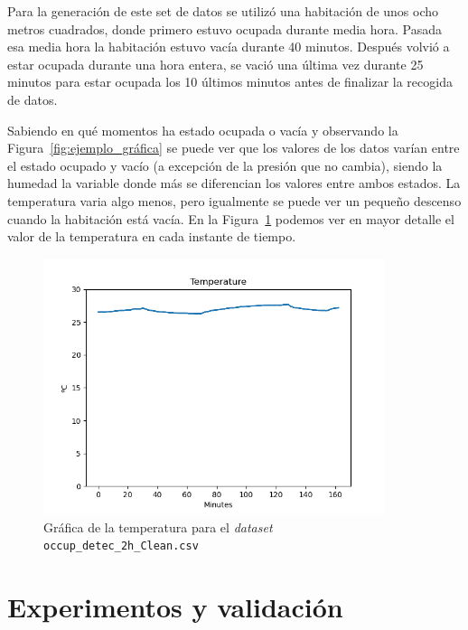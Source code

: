 \documentclass[a4paper, 12pt]{book}
\begin{document}
Para la generación de este set de datos se utilizó una habitación de unos ocho metros cuadrados, donde primero estuvo ocupada durante media hora. Pasada esa media hora la habitación estuvo vacía durante 40 minutos. Después volvió a estar ocupada durante una hora entera, se vació una última vez durante 25 minutos para estar ocupada los 10 últimos minutos antes de finalizar la recogida de datos.

Sabiendo en qué momentos ha estado ocupada o vacía y observando la Figura~\ref{fig:ejemplo_gráfica} se puede ver que los valores de los datos varían entre el estado ocupado y vacío (a excepción de la presión que no cambia), siendo la humedad la variable donde más se diferencian los valores entre ambos estados. La temperatura varia algo menos, pero igualmente se puede ver un pequeño descenso cuando la habitación está vacía. En la Figura~\ref{fig:graf_temp} podemos ver en mayor detalle el valor de la temperatura en cada instante de tiempo.

\begin{figure}[]
  \centering
  \includegraphics[width=10cm, keepaspectratio]{img/Temp_occup_detec_2h_original.png}
  \caption{Gráfica de la temperatura para el \textit{dataset} \texttt{occup\_detec\_2h\_Clean.csv}}\label{fig:graf_temp}
\end{figure}

\cleardoublepage


\chapter{Experimentos y validación}
\label{chap:experimentos}
\end{document}
